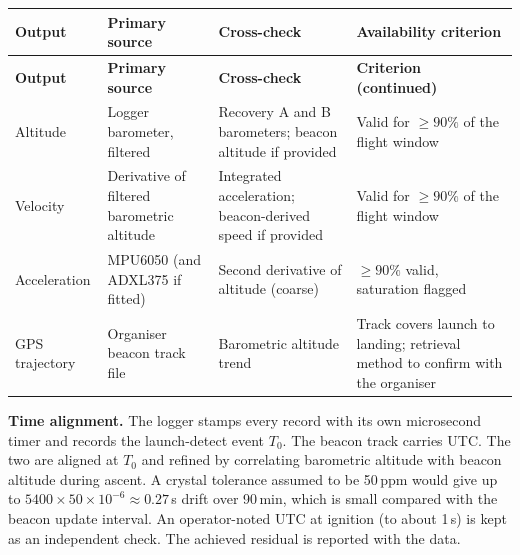 \small
{}
\begin{longtable}{@{}L{24mm}L{40mm}L{42mm}L{40mm}@{}}
\toprule{}\textbf{Output}&\textbf{Primary source}&\textbf{Cross-check}&\textbf{Availability criterion}\\\midrule\endfirsthead
\toprule{}\textbf{Output}&\textbf{Primary source}&\textbf{Cross-check}&\textbf{Criterion (continued)}\\\midrule\endhead
\bottomrule\endlastfoot
Altitude & Logger barometer, filtered & Recovery A and B barometers; beacon altitude if provided & Valid for $\ge90\%$ of the flight window\\
Velocity & Derivative of filtered barometric altitude & Integrated acceleration; beacon-derived speed if provided & Valid for $\ge90\%$ of the flight window\\
Acceleration & MPU6050 (and ADXL375 if fitted) & Second derivative of altitude (coarse) & $\ge90\%$ valid, saturation flagged\\
GPS trajectory & Organiser beacon track file & Barometric altitude trend & Track covers launch to landing; retrieval method to confirm with the organiser\\
\end{longtable}
\normalsize

\textbf{Time alignment.} The logger stamps every record with its own microsecond timer and records the launch-detect event $T_0$. The beacon track carries UTC. The two are aligned at $T_0$ and refined by correlating barometric altitude with beacon altitude during ascent. A crystal tolerance assumed to be 50\,ppm would give up to $5400\times50\times10^{-6}\approx0.27$\,s drift over 90\,min, which is small compared with the beacon update interval. An operator-noted UTC at ignition (to about 1\,s) is kept as an independent check. The achieved residual is reported with the data.

